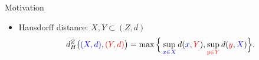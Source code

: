 \documentclass{beamer}
\begin{document}
\begin{frame}{Motivation}
  \vspace{0.4cm}
  {\color{brown}{But where Gromov-Wasserstein comes from?}}
  \begin{minipage}[t]{0.6\linewidth}
    \begin{itemize}
      \item Hausdorff distance: $X, Y \subset (Z, d)$
      \vspace{-0.3cm}
      \begin{align*}
        d_{H}^{Z}\big( {\color{blue}{(X, d)}}, {\color{red}{(Y, d)}} \big)
        = \max \Big\{ \sup_{{\color{blue}{x \in X}}} d({\color{blue}{x}}, {\color{red}{Y}}),
        \sup_{{\color{red}{y \in Y}}} d({\color{red}{y}}, {\color{blue}{X}}) \Big\}.
      \end{align*}


\end{itemize}
\end{minipage}
\end{frame}
\end{document}
